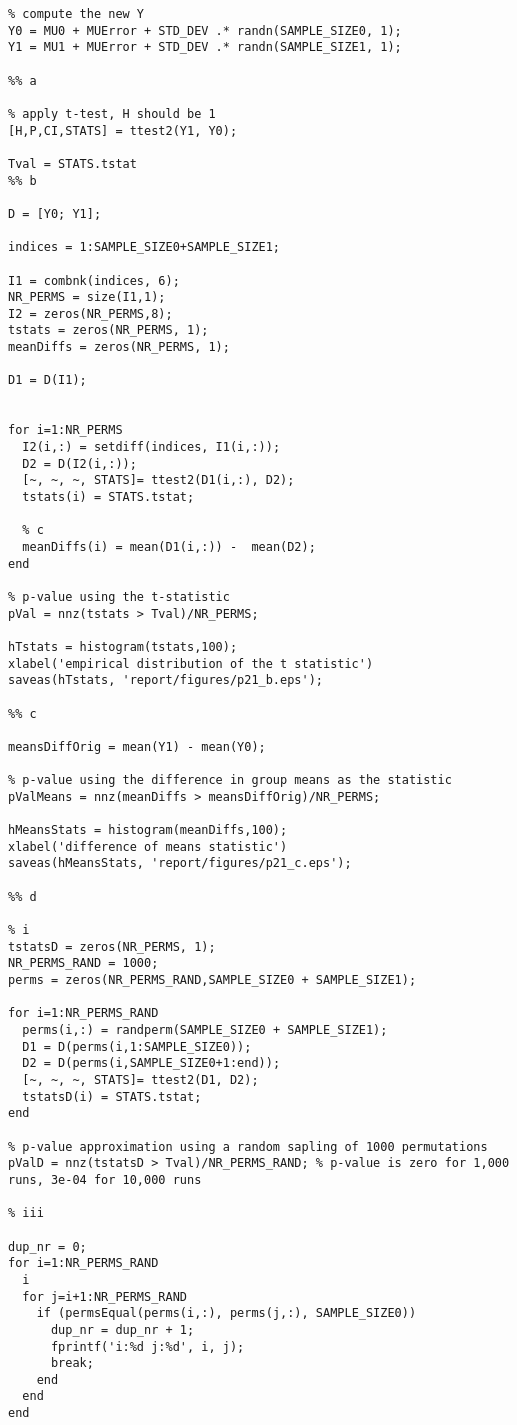 \documentclass[11pt,a4paper,oneside]{report}
\begin{document}
\begin{lstlisting}
% compute the new Y
Y0 = MU0 + MUError + STD_DEV .* randn(SAMPLE_SIZE0, 1);
Y1 = MU1 + MUError + STD_DEV .* randn(SAMPLE_SIZE1, 1);

%% a

% apply t-test, H should be 1
[H,P,CI,STATS] = ttest2(Y1, Y0);

Tval = STATS.tstat
%% b

D = [Y0; Y1];

indices = 1:SAMPLE_SIZE0+SAMPLE_SIZE1;

I1 = combnk(indices, 6);
NR_PERMS = size(I1,1);
I2 = zeros(NR_PERMS,8);
tstats = zeros(NR_PERMS, 1);
meanDiffs = zeros(NR_PERMS, 1);

D1 = D(I1);


for i=1:NR_PERMS
  I2(i,:) = setdiff(indices, I1(i,:));
  D2 = D(I2(i,:));
  [~, ~, ~, STATS]= ttest2(D1(i,:), D2);
  tstats(i) = STATS.tstat;
  
  % c
  meanDiffs(i) = mean(D1(i,:)) -  mean(D2);
end

% p-value using the t-statistic
pVal = nnz(tstats > Tval)/NR_PERMS;

hTstats = histogram(tstats,100);
xlabel('empirical distribution of the t statistic')
saveas(hTstats, 'report/figures/p21_b.eps');

%% c

meansDiffOrig = mean(Y1) - mean(Y0);

% p-value using the difference in group means as the statistic
pValMeans = nnz(meanDiffs > meansDiffOrig)/NR_PERMS;

hMeansStats = histogram(meanDiffs,100);
xlabel('difference of means statistic')
saveas(hMeansStats, 'report/figures/p21_c.eps');

%% d

% i
tstatsD = zeros(NR_PERMS, 1);
NR_PERMS_RAND = 1000;
perms = zeros(NR_PERMS_RAND,SAMPLE_SIZE0 + SAMPLE_SIZE1);

for i=1:NR_PERMS_RAND
  perms(i,:) = randperm(SAMPLE_SIZE0 + SAMPLE_SIZE1);
  D1 = D(perms(i,1:SAMPLE_SIZE0));
  D2 = D(perms(i,SAMPLE_SIZE0+1:end));
  [~, ~, ~, STATS]= ttest2(D1, D2);
  tstatsD(i) = STATS.tstat;
end

% p-value approximation using a random sapling of 1000 permutations
pValD = nnz(tstatsD > Tval)/NR_PERMS_RAND; % p-value is zero for 1,000 runs, 3e-04 for 10,000 runs

% iii

dup_nr = 0;
for i=1:NR_PERMS_RAND
  i
  for j=i+1:NR_PERMS_RAND
    if (permsEqual(perms(i,:), perms(j,:), SAMPLE_SIZE0))
      dup_nr = dup_nr + 1;
      fprintf('i:%d j:%d', i, j);
      break;
    end
  end
end 


\end{lstlisting}
\end{document}
